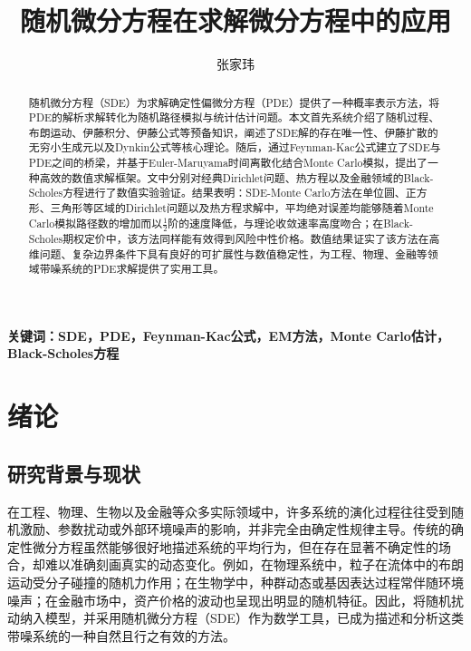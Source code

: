 \documentclass[UTF8，12pt]{ctexart}
\title{随机微分方程在求解微分方程中的应用}
\author{张家玮}
\numberwithin{equation}{section}
\begin{document}
\maketitle

\begin{abstract}
\normalsize
随机微分方程（SDE）为求解确定性偏微分方程（PDE）提供了一种概率表示方法，将PDE的解析求解转化为随机路径模拟与统计估计问题。本文首先系统介绍了随机过程、布朗运动、伊藤积分、伊藤公式等预备知识，阐述了SDE解的存在唯一性、伊藤扩散的无穷小生成元以及Dynkin公式等核心理论。随后，通过Feynman-Kac公式建立了SDE与PDE之间的桥梁，并基于Euler-Maruyama时间离散化结合Monte Carlo模拟，提出了一种高效的数值求解框架。文中分别对经典Dirichlet问题、热方程以及金融领域的Black-Scholes方程进行了数值实验验证。结果表明：SDE-Monte Carlo方法在单位圆、正方形、三角形等区域的Dirichlet问题以及热方程求解中，平均绝对误差均能够随着Monte Carlo模拟路径数的增加而以$\frac{1}{2}$阶的速度降低，与理论收敛速率高度吻合；在Black-Scholes期权定价中，该方法同样能有效得到风险中性价格。数值结果证实了该方法在高维问题、复杂边界条件下具有良好的可扩展性与数值稳定性，为工程、物理、金融等领域带噪系统的PDE求解提供了实用工具。
\end{abstract}

\bigskip

\noindent\textbf{关键词：SDE，PDE，Feynman-Kac公式，EM方法，Monte Carlo估计，Black-Scholes方程}

\newpage
\tableofcontents
\newpage


\section{绪论}
\subsection{研究背景与现状}
在工程、物理、生物以及金融等众多实际领域中，许多系统的演化过程往往受到随机激励、参数扰动或外部环境噪声的影响，并非完全由确定性规律主导。传统的确定性微分方程虽然能够很好地描述系统的平均行为，但在存在显著不确定性的场合，却难以准确刻画真实的动态变化。例如，在物理系统中，粒子在流体中的布朗运动受分子碰撞的随机力作用；在生物学中，种群动态或基因表达过程常伴随环境噪声；在金融市场中，资产价格的波动也呈现出明显的随机特征。因此，将随机扰动纳入模型，并采用随机微分方程（SDE）作为数学工具，已成为描述和分析这类带噪系统的一种自然且行之有效的方法。
\end{document}
